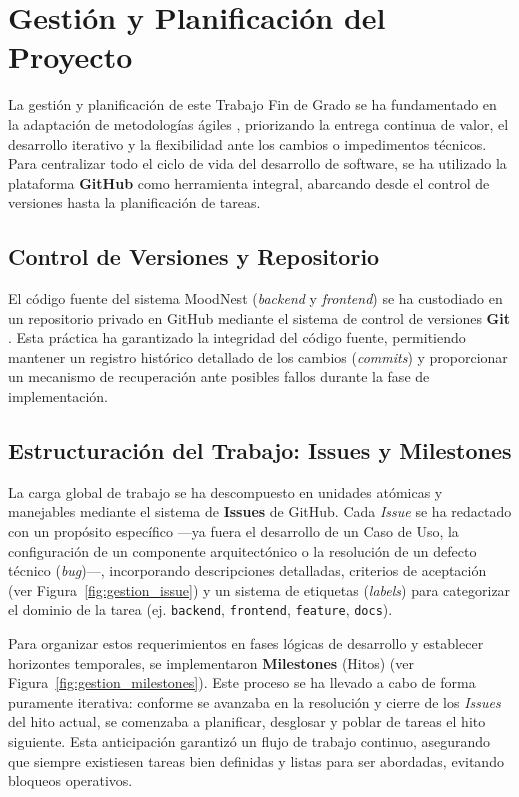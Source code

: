 \section{Gestión y Planificación del Proyecto}
\label{sec:gestion_proyecto}

La gestión y planificación de este Trabajo Fin de Grado se ha fundamentado en la adaptación de metodologías ágiles \cite{bib:agile_redhat}, priorizando la entrega continua de valor, el desarrollo iterativo y la flexibilidad ante los cambios o impedimentos técnicos. Para centralizar todo el ciclo de vida del desarrollo de software, se ha utilizado la plataforma \textbf{GitHub} \cite{bib:github} como herramienta integral, abarcando desde el control de versiones hasta la planificación de tareas.

\subsection{Control de Versiones y Repositorio}

El código fuente del sistema MoodNest (\textit{backend} y \textit{frontend}) se ha custodiado en un repositorio privado en GitHub mediante el sistema de control de versiones \textbf{Git} \cite{bib:git}. Esta práctica ha garantizado la integridad del código fuente, permitiendo mantener un registro histórico detallado de los cambios (\textit{commits}) y proporcionar un mecanismo de recuperación ante posibles fallos durante la fase de implementación.

\subsection{Estructuración del Trabajo: Issues y Milestones}

La carga global de trabajo se ha descompuesto en unidades atómicas y manejables mediante el sistema de \textbf{Issues} de GitHub. Cada \textit{Issue} se ha redactado con un propósito específico —ya fuera el desarrollo de un Caso de Uso, la configuración de un componente arquitectónico o la resolución de un defecto técnico (\textit{bug})—, incorporando descripciones detalladas, criterios de aceptación (ver Figura~\ref{fig:gestion_issue}) y un sistema de etiquetas (\textit{labels}) para categorizar el dominio de la tarea (ej. \texttt{backend}, \texttt{frontend}, \texttt{feature}, \texttt{docs}).

Para organizar estos requerimientos en fases lógicas de desarrollo y establecer horizontes temporales, se implementaron \textbf{Milestones} (Hitos)  (ver Figura~\ref{fig:gestion_milestones}). Este proceso se ha llevado a cabo de forma puramente iterativa: conforme se avanzaba en la resolución y cierre de los \textit{Issues} del hito actual, se comenzaba a planificar, desglosar y poblar de tareas el hito siguiente. Esta anticipación garantizó un flujo de trabajo continuo, asegurando que siempre existiesen tareas bien definidas y listas para ser abordadas, evitando bloqueos operativos.

